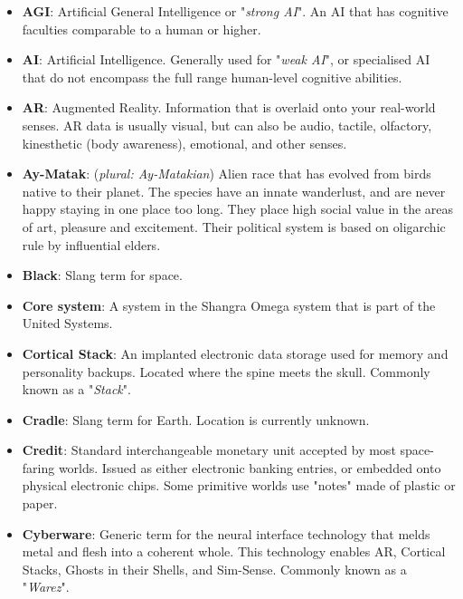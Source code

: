 \documentclass[10pt,twoside]{article}
\begin{document}
  \begin{multicols}{2}

  \begin{itemize}

    \item \textbf{AGI}: Artificial General Intelligence or "\textit{strong AI}". An AI that has cognitive faculties comparable to a human or higher.

    \item \textbf{AI}: Artificial Intelligence. Generally used for "\textit{weak AI}", or specialised AI that do not encompass the full range human-level cognitive abilities.

    \item \textbf{AR}: Augmented Reality. Information that is overlaid onto your real-world senses. AR data is usually visual, but can also be audio, tactile, olfactory, kinesthetic (body awareness), emotional, and other senses.

    \item \textbf{Ay-Matak}: (\textit{plural: Ay-Matakian}) Alien race that has evolved from birds native to their planet. The species have an innate wanderlust, and are never happy staying in one place too long. They place high social value in the areas of art, pleasure and excitement. Their political system is based on oligarchic rule by influential elders.

    \item \textbf{Black}: Slang term for space.
    
    \item \textbf{Core system}: A system in the Shangra Omega system that is part of the United Systems.

    \item \textbf{Cortical Stack}: An implanted electronic data storage used for memory and personality backups. Located where the spine meets the skull. Commonly known as a "\textit{Stack}".

    \item \textbf{Cradle}: Slang term for Earth. Location is currently unknown.

    \item \textbf{Credit}: Standard interchangeable monetary unit accepted by most space-faring worlds. Issued as either electronic banking entries, or embedded onto physical electronic chips. Some primitive worlds use "notes" made of plastic or paper.

    \item \textbf{Cyberware}: Generic term for the neural interface technology that melds metal and flesh into a coherent whole. This technology enables AR, Cortical Stacks, Ghosts in their Shells, and Sim-Sense. Commonly known as a "\textit{Warez}".


\end{itemize}
\end{multicols}
\end{document}
